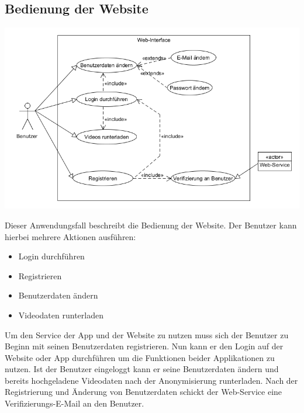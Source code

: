 \subsection{Bedienung der Website}
\begin{center}
\includegraphics[width=1\textwidth]{subtopicsFuncspec/systemModels/WebsiteAWFDiagram.png}
\end{center}	
Dieser Anwendungsfall beschreibt die Bedienung der Website.
Der Benutzer kann hierbei mehrere Aktionen ausführen:
\begin{itemize}
\item Login durchführen
\item Registrieren
\item Benutzerdaten ändern
\item Videodaten runterladen
\end{itemize}
Um den Service der App und der Website zu nutzen muss sich der Benutzer zu Beginn mit seinen Benutzerdaten registrieren. 
Nun kann er den Login auf der Website oder App durchführen um die Funktionen beider Applikationen zu nutzen. 
Ist der Benutzer eingeloggt kann er seine Benutzerdaten ändern und bereits hochgeladene Videodaten nach der Anonymisierung runterladen.
Nach der Registrierung und Änderung von Benutzerdaten schickt der Web-Service eine Verifizierungs-E-Mail an den Benutzer.
